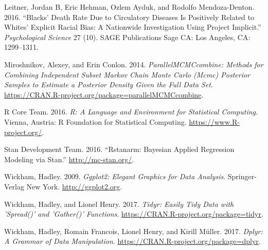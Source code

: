 \documentclass[]{article}
\theoremstyle{definition}
\theoremstyle{definition}
\theoremstyle{remark}
\begin{document}
\hypertarget{ref-leitner2016blacks}{}
Leitner, Jordan B, Eric Hehman, Ozlem Ayduk, and Rodolfo Mendoza-Denton.
2016. ``Blacks' Death Rate Due to Circulatory Diseases Is Positively
Related to Whites' Explicit Racial Bias: A Nationwide Investigation
Using Project Implicit.'' \emph{Psychological Science} 27 (10). SAGE
Publications Sage CA: Los Angeles, CA: 1299--1311.

\hypertarget{ref-miroshnikov2014parallel}{}
Miroshnikov, Alexey, and Erin Conlon. 2014. \emph{ParallelMCMCcombine:
Methods for Combining Independent Subset Markov Chain Monte Carlo (Mcmc)
Posterior Samples to Estimate a Posterior Density Given the Full Data
Set}. \url{https://CRAN.R-project.org/package=parallelMCMCcombine}.

\hypertarget{ref-rcitation}{}
R Core Team. 2016. \emph{R: A Language and Environment for Statistical
Computing}. Vienna, Austria: R Foundation for Statistical Computing.
\url{https://www.R-project.org/}.

\hypertarget{ref-rstanarm2016}{}
Stan Development Team. 2016. ``Rstanarm: Bayesian Applied Regression
Modeling via Stan.'' \url{http://mc-stan.org/}.

\hypertarget{ref-wickham2009ggplot2}{}
Wickham, Hadley. 2009. \emph{Ggplot2: Elegant Graphics for Data
Analysis}. Springer-Verlag New York. \url{http://ggplot2.org}.

\hypertarget{ref-wickham2017tidyr}{}
Wickham, Hadley, and Lionel Henry. 2017. \emph{Tidyr: Easily Tidy Data
with 'Spread()' and 'Gather()' Functions}.
\url{https://CRAN.R-project.org/package=tidyr}.

\hypertarget{ref-wickham2017dplyr}{}
Wickham, Hadley, Romain Francois, Lionel Henry, and Kirill Müller. 2017.
\emph{Dplyr: A Grammar of Data Manipulation}.
\url{https://CRAN.R-project.org/package=dplyr}.
\end{document}
